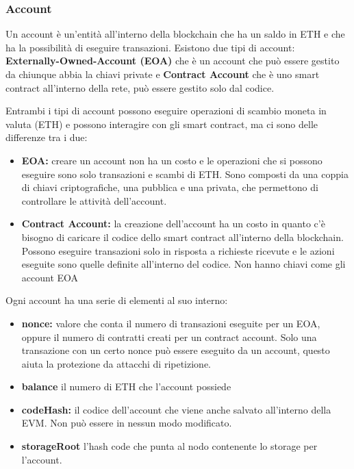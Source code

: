 \subsubsection{Account}
Un account è un'entità all'interno della blockchain che ha un saldo in ETH e
che ha la possibilità di eseguire transazioni. Esistono due tipi di account:
\textbf{Externally-Owned-Account (EOA)} che è un account che può essere gestito
da chiunque abbia la chiavi private e \textbf{Contract Account} che è uno smart
contract all'interno della rete, può essere gestito solo dal codice.

Entrambi i tipi di account possono eseguire operazioni di scambio moneta 
in valuta (ETH) e possono interagire con gli smart contract, ma ci sono delle 
differenze tra i due:

\begin{itemize}
    \item \textbf{EOA:} creare un account non ha un costo e le operazioni che 
        si possono eseguire sono solo transazioni e scambi di ETH. Sono 
        composti da una coppia di chiavi criptografiche, una 
        pubblica e una privata, che permettono di controllare le attività
        dell'account.
    \item \textbf{Contract Account:} la creazione dell'account ha un costo
        in quanto c'è bisogno di caricare il codice dello smart contract
        all'interno della blockchain. Possono eseguire transazioni solo in 
        risposta a richieste ricevute e le azioni eseguite sono quelle definite
        all'interno del codice. Non hanno chiavi come gli account EOA
\end{itemize}

Ogni account ha una serie di elementi al suo interno:
\begin{itemize}
    \item \textbf{nonce:} valore che conta il numero di transazioni eseguite
        per un EOA, oppure il numero di contratti creati per un contract
        account. Solo una transazione con un certo nonce può essere eseguito
        da un account, questo aiuta la protezione da attacchi di ripetizione.
    \item \textbf{balance} il numero di ETH che l'account possiede
    \item \textbf{codeHash:} il codice dell'account che viene anche salvato 
        all'interno della EVM. Non può essere in nessun modo modificato.
    \item \textbf{storageRoot} l'hash code che punta al nodo contenente lo 
        storage per l'account.
\end{itemize}

